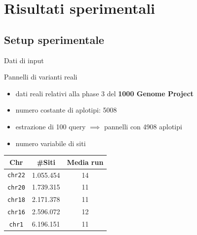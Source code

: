 \documentclass[]{beamer}
\def\PBWT{\mbox{\rm {\sf PBWT}}}
\def\RLPBWT{\mbox{\rm {\sf RLPBWT}}}
\def\Cplusplus{C\raisebox{0.5ex}{\tiny\textbf{++}}}
\begin{document}
\section{Risultati sperimentali}
\subsection{Setup sperimentale}
\begin{frame}{Dati di input}
  \begin{block}{Pannelli di varianti reali}
    \begin{itemize}
      \item dati reali relativi alla phase 3 del \textbf{1000 Genome Project}
      \item numero costante di aplotipi: 5008
      \item estrazione di 100 query $\implies$ pannelli con 4908 aplotipi
      \item numero variabile di siti
    \end{itemize}
  \end{block}
  \begin{table}[H]
    \centering
    \begin{tabular}{c||c|c}
      \textbf{Chr} & \textbf{\#Siti} & \textbf{Media run} \\ 
      \hline
      \texttt{chr22} & 1.055.454 & 14\\
      \texttt{chr20} & 1.739.315 & 11\\
      \texttt{chr18} & 2.171.378 & 11\\
      \texttt{chr16} & 2.596.072 & 12\\
      \texttt{chr1} & 6.196.151 & 11\\
    \end{tabular}
  \end{table}
\end{frame}
\end{document}
